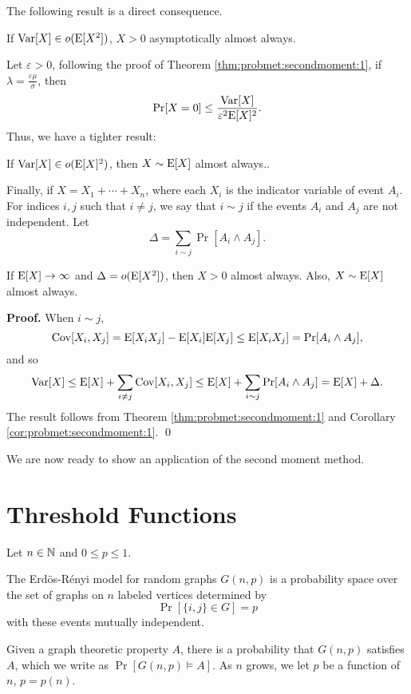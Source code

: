 The following result is a direct consequence. 

\begin{corollary}\label{cor:probmet:secondmoment:1}
    If $\mathrm{Var}[X] \in o(\mathrm{E}[X^2])$, $X > 0$ asymptotically almost always. 
\end{corollary}

Let $\varepsilon > 0$, following the proof of Theorem \ref{thm:probmet:secondmoment:1}, if $\lambda = \frac{\varepsilon\mu}{\sigma}$, then
\[\mathrm{Pr}[X = 0] \leq \frac{\mathrm{Var}[X]}{\varepsilon^2\mathrm{E}[X]^2}.\]
Thus, we have a tighter result:
\begin{corollary}\label{cor:probmet:secondmoment:2}
    If $\mathrm{Var}[X] \in o(\mathrm{E}[X]^2)$, then $X \sim \mathrm{E}[X]$ almost always.. 
\end{corollary}

Finally, if $X = X_1 + \cdots + X_n$, where each $X_i$ is the indicator variable of event $A_i$. For indices $i, j$ such that $i \neq j$, we say that $i \sim j$ if the events $A_i$ and $A_j$ are not independent. Let
\begin{equation}\label{eq:probmet:delta}
\Delta  = \sum_{i \sim j} \Pr[A_i \wedge A_j].
\end{equation}
\begin{corollary}\label{cor:probmet:secondmoment:3}
    If $\mathrm{E}[X] \to \infty$ and $\Delta = o(\mathrm{E}[X^2])$, then $X > 0$ almost always. Also, $X \sim \mathrm{E}[X]$ almost always.
\end{corollary}
\textbf{Proof. } When $i \sim j$, 
\[\mathrm{Cov}[X_i, X_j] = \mathrm{E}[X_iX_j] - \mathrm{E}[X_i]\mathrm{E}[X_j] \leq \mathrm{E}[X_iX_j] = \mathrm{Pr}[A_i \wedge A_j],\]
and so 
\begin{equation}\label{eq:probmet:deltainequality}
\mathrm{Var}[X] \leq \mathrm{E}[X] + \sum_{i \neq j}\mathrm{Cov}[X_i, X_j] \leq \mathrm{E}[X] + \sum_{i \sim j}\mathrm{Pr}[A_i \wedge A_j] = \mathrm{E}[X] + \Delta. 
\end{equation}
The result follows from Theorem \ref{thm:probmet:secondmoment:1} and Corollary \ref{cor:probmet:secondmoment:1}. \qed \par 

We are now ready to show an application of the second moment method. \par
\section{Threshold Functions}\label{sec:probmet:threshold}

Let $n \in \mathbb{N}$ and $0 \leq p \leq 1$. 
\begin{definition}\label{def:probmet:ermodel}
    The Erdös-Rényi model for random graphs $G(n, p)$ is a probability space over the set of graphs on $n$ labeled vertices determined by
    \[\Pr[\{i, j\} \in G] = p\] 
    with these events mutually independent.
\end{definition}
 Given a graph theoretic property $A$, there is a probability that $G(n, p)$ satisfies $A$, which we write as $\Pr[G(n, p) \vDash A]$. As $n$ grows, we let $p$ be a function of $n$, $p = p(n)$. \par

